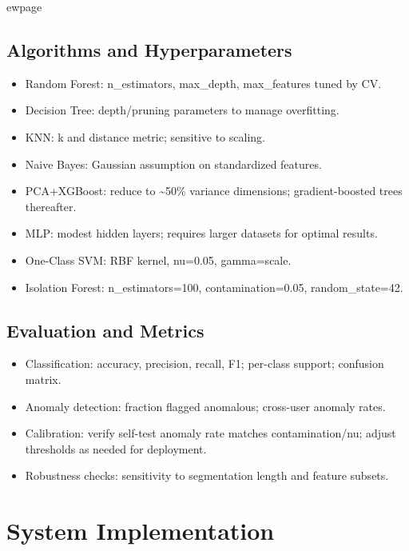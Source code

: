 \documentclass[
  12pt,
  a4paper,
]{report}
\providecommand{\tightlist}{%
  \setlength{\itemsep}{0pt}\setlength{\parskip}{0pt}}
\begin{document}
ewpage

\section{Algorithms and
Hyperparameters}\label{algorithms-and-hyperparameters}

\begin{itemize}
\tightlist
\item
  Random Forest: n\_estimators, max\_depth, max\_features tuned by CV.
\item
  Decision Tree: depth/pruning parameters to manage overfitting.
\item
  KNN: k and distance metric; sensitive to scaling.
\item
  Naive Bayes: Gaussian assumption on standardized features.
\item
  PCA+XGBoost: reduce to \textasciitilde50\% variance dimensions;
  gradient-boosted trees thereafter.
\item
  MLP: modest hidden layers; requires larger datasets for optimal
  results.
\item
  One-Class SVM: RBF kernel, nu=0.05, gamma=scale.
\item
  Isolation Forest: n\_estimators=100, contamination=0.05,
  random\_state=42.
\end{itemize}

\section{Evaluation and Metrics}\label{evaluation-and-metrics}

\begin{itemize}
\tightlist
\item
  Classification: accuracy, precision, recall, F1; per-class support;
  confusion matrix.
\item
  Anomaly detection: fraction flagged anomalous; cross-user anomaly
  rates.
\item
  Calibration: verify self-test anomaly rate matches contamination/nu;
  adjust thresholds as needed for deployment.
\item
  Robustness checks: sensitivity to segmentation length and feature
  subsets.
\end{itemize}

\chapter{System Implementation}\label{system-implementation}
\end{document}
